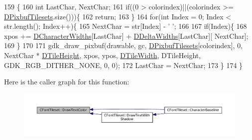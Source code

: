 \begin{DoxyCode}
159                                                                                                            
                       \{
160     \textcolor{keywordtype}{int} LastChar, NextChar;
161     \textcolor{keywordflow}{if}((0 > colorindex)||(colorindex >= \hyperlink{classCFontTileset_ae6e92dd613809fb15892b51e0e6b4940}{DPixbufTilesets}.size()))\{
162         \textcolor{keywordflow}{return};    
163     \}
164     \textcolor{keywordflow}{for}(\textcolor{keywordtype}{int} Index = 0; Index < str.length(); Index++)\{
165         NextChar = str[Index] - \textcolor{charliteral}{' '};
166         
167         \textcolor{keywordflow}{if}(Index)\{
168             xpos += \hyperlink{classCFontTileset_ad25347b5350a8380be8c550d9f2e2798}{DCharacterWidths}[LastChar] + \hyperlink{classCFontTileset_a1e253853e14282e9582a7f47dace8f70}{DDeltaWidths}[LastChar][
      NextChar]; 
169         \}
170         
171         gdk\_draw\_pixbuf(drawable, gc, \hyperlink{classCFontTileset_ae6e92dd613809fb15892b51e0e6b4940}{DPixbufTilesets}[colorindex], 0, NextChar * 
      \hyperlink{classCGraphicTileset_af48f32e07d5fe69afd5f764318cc3244}{DTileHeight}, xpos, ypos, \hyperlink{classCGraphicTileset_a2d0c7d19865b81911a3a43d5cae50e00}{DTileWidth}, DTileHeight, GDK\_RGB\_DITHER\_NONE, 0, 0);
172         LastChar = NextChar;
173     \}
174 \}
\end{DoxyCode}
Here is the caller graph for this function\+:\nopagebreak
\begin{figure}[H]
\begin{center}
\leavevmode
\includegraphics[width=350pt]{classCFontTileset_a987f13f64865891b7bf8b10f0b519fb7_icgraph}
\end{center}
\end{figure}
\hypertarget{classCFontTileset_a6716e51a5692130847914287a5f1b734}{}\label{classCFontTileset_a6716e51a5692130847914287a5f1b734} 
